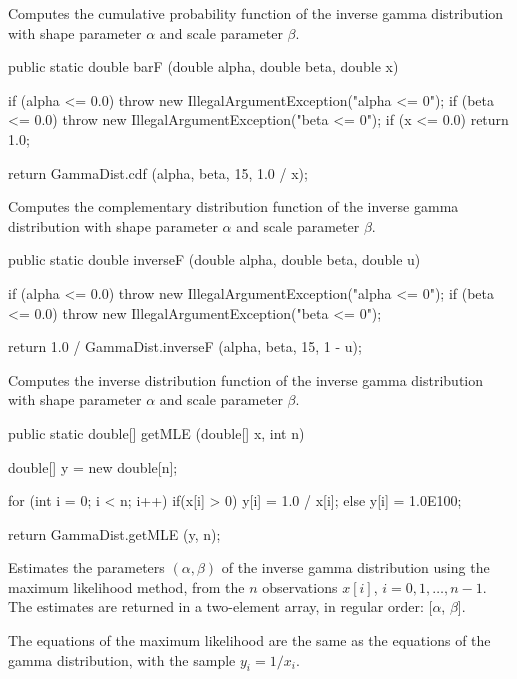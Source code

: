 \begin{tabb}
Computes the cumulative probability function of the inverse gamma distribution
 with shape parameter $\alpha$  and scale parameter $\beta$.
\end{tabb}
\begin{code}

   public static double barF (double alpha, double beta, double x)\begin{hide} {
      if (alpha <= 0.0)
         throw new IllegalArgumentException("alpha <= 0");
      if (beta <= 0.0)
         throw new IllegalArgumentException("beta <= 0");
      if (x <= 0.0)
         return 1.0;

      return GammaDist.cdf (alpha, beta, 15, 1.0 / x);
   }\end{hide}
\end{code}
\begin{tabb}
   Computes the complementary distribution function of the inverse gamma distribution
   with shape parameter $\alpha$ and scale parameter $\beta$.
\end{tabb}
\begin{code}

   public static double inverseF (double alpha, double beta, double u)\begin{hide} {
      if (alpha <= 0.0)
         throw new IllegalArgumentException("alpha <= 0");
      if (beta <= 0.0)
         throw new IllegalArgumentException("beta <= 0");

      return 1.0 / GammaDist.inverseF (alpha, beta, 15, 1 - u);
   }\end{hide}
\end{code}
\begin{tabb}
   Computes the inverse distribution function of the inverse gamma  distribution
   with shape parameter $\alpha$ and scale parameter $\beta$.
\end{tabb}
\begin{code}

   public static double[] getMLE (double[] x, int n)\begin{hide} {
      double[] y = new double[n];

      for (int i = 0; i < n; i++) {
	      if(x[i] > 0)
	         y[i] = 1.0 / x[i];
	      else
	         y[i] = 1.0E100;
      }

      return GammaDist.getMLE (y, n);
   }\end{hide}
\end{code}
\begin{tabb}
   Estimates the parameters $(\alpha,\beta)$ of the inverse gamma distribution
   using the maximum likelihood method, from the $n$ observations
   $x[i]$, $i = 0, 1,\ldots, n-1$. The estimates are returned in a two-element
    array, in regular order: [$\alpha$, $\beta$].
   \begin{detailed}
   The equations of the maximum likelihood are the same as the equations of
   the gamma distribution, with the sample $y_i = 1/x_i$.
 \end{detailed}
\end{tabb}
